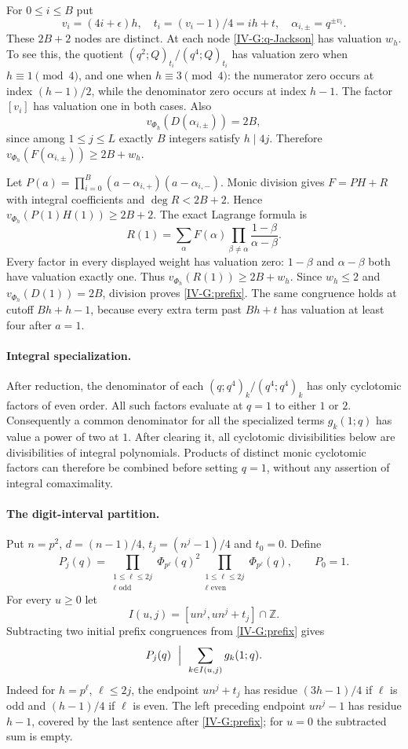 \documentclass[11pt,letterpaper]{article}
\numberwithin{equation}{section}
\begin{document}
For $0\le i\le B$ put
\[
v_i=(4i+\epsilon)h,\quad t_i=(v_i-1)/4=ih+t,
\quad\alpha_{i,\pm}=q^{\pm v_i}.
\]
These $2B+2$ nodes are distinct. At each node
\eqref{IV-G:q-Jackson} has valuation $w_h$. To see this, the
quotient $(q^2;Q)_{t_i}/(q^4;Q)_{t_i}$ has valuation zero
when $h\equiv1\pmod4$, and one when $h\equiv3\pmod4$:
the numerator zero occurs at index $(h-1)/2$, while the
denominator zero occurs at index $h-1$. The factor $[v_i]$
has valuation one in both cases. Also
\[
v_{\Phi_h}(D(\alpha_{i,\pm}))=2B,
\]
since among $1\le j\le L$ exactly $B$ integers satisfy
$h\mid4j$. Therefore $v_{\Phi_h}(F(\alpha_{i,\pm}))\ge2B+w_h$.

Let $P(a)=\prod_{i=0}^{B}(a-\alpha_{i,+})(a-\alpha_{i,-})$.
Monic division gives $F=PH+R$ with integral coefficients and
$\deg R<2B+2$. Hence $v_{\Phi_h}(P(1)H(1))\ge2B+2$.
The exact Lagrange formula is
\[
R(1)=\sum_{\alpha}F(\alpha)
 \prod_{\beta\ne\alpha}\frac{1-\beta}{\alpha-\beta}.
\]
Every factor in every displayed weight has valuation zero:
$1-\beta$ and $\alpha-\beta$ both have valuation exactly one.
Thus $v_{\Phi_h}(R(1))\ge2B+w_h$. Since $w_h\le2$ and
$v_{\Phi_h}(D(1))=2B$, division proves \eqref{IV-G:prefix}.
The same congruence holds at cutoff $Bh+h-1$, because every
extra term past $Bh+t$ has valuation at least four after $a=1$.

\paragraph{Integral specialization.}
After reduction, the denominator of each
$(q;q^4)_k/(q^4;q^4)_k$ has only cyclotomic factors of even
order. All such factors evaluate at $q=1$ to either $1$ or $2$.
Consequently a common denominator for all the specialized terms
$g_k(1;q)$ has value a power of two at $1$. After clearing it,
all cyclotomic divisibilities below are divisibilities of integral
polynomials. Products of distinct monic cyclotomic factors can
therefore be combined before setting $q=1$, without any assertion
of integral comaximality.

\paragraph{The digit-interval partition.}
Put $n=p^2$, $d=(n-1)/4$, $t_j=(n^j-1)/4$ and $t_0=0$. Define
\[
P_j(q)=\prod_{\substack{1\le\ell\le2j\\\ell\text{ odd}}}
\Phi_{p^\ell}(q)^2
\prod_{\substack{1\le\ell\le2j\\\ell\text{ even}}}
\Phi_{p^\ell}(q),\qquad P_0=1.
\]
For every $u\ge0$ let
\[
I(u,j)=[un^j,un^j+t_j]\cap\mathbb Z.
\]
Subtracting two initial prefix congruences from \eqref{IV-G:prefix}
gives
\begin{equation}\label{IV-G:shifted-prefix}
P_j(q)\ \Bigm|\ \sum_{k\in I(u,j)}g_k(1;q).
\end{equation}
Indeed for $h=p^\ell$, $\ell\le2j$, the endpoint $un^j+t_j$
has residue $(3h-1)/4$ if $\ell$ is odd and $(h-1)/4$ if
$\ell$ is even. The left preceding endpoint $un^j-1$ has
residue $h-1$, covered by the last sentence after
\eqref{IV-G:prefix}; for $u=0$ the subtracted sum is empty.
\end{document}
